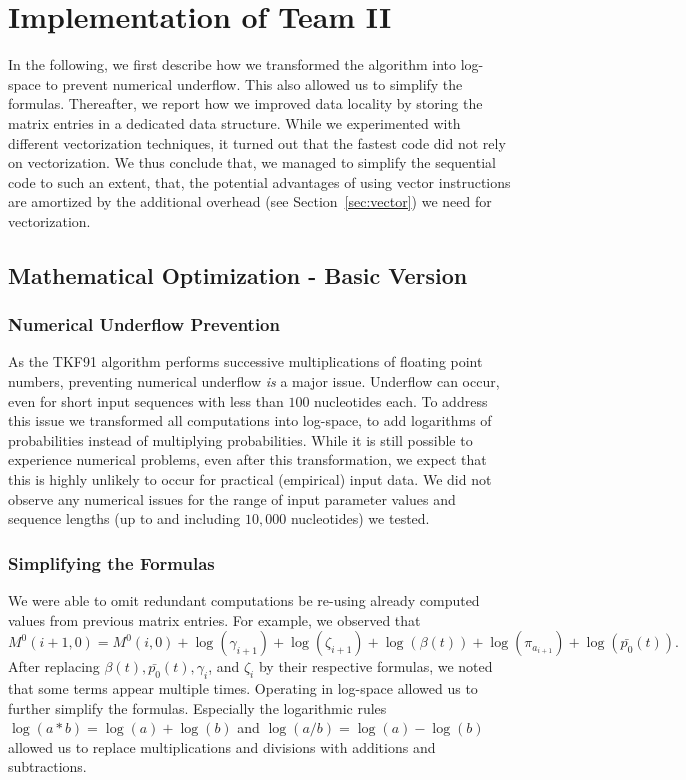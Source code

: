 \documentclass[runningheads,a4paper]{llncs}
\begin{document}
\section{Implementation of Team II}
\label{sec:implementation-2}

In the following, we first describe how we transformed the algorithm into log-space to prevent numerical underflow. 
This also allowed us to simplify the formulas. 
Thereafter, we report how we improved data locality by storing the matrix entries in a dedicated data structure. 
While we experimented with different vectorization techniques, it turned out that the fastest code did not rely on vectorization. 
We thus conclude that, we managed to simplify the sequential code to such an extent, that, the potential advantages of using vector instructions 
are amortized by the additional overhead (see Section~\ref{sec:vector}) we need for vectorization.

\subsection{Mathematical Optimization - Basic Version}

\subsubsection{Numerical Underflow Prevention}
\label{sec:log}

As the TKF91 algorithm performs successive multiplications of floating point numbers, preventing numerical underflow
{\em is} a major issue. Underflow can occur, even for short input sequences with less than $100$ nucleotides each.
To address this issue we transformed all computations into log-space, to add logarithms of probabilities instead of multiplying probabilities.
While it is still possible to experience numerical problems, even after this transformation, 
we expect that this is highly unlikely to occur for practical (empirical) input data.
We did not observe any numerical issues for the range of input parameter values and sequence lengths (up to and including $10,000$ nucleotides) 
we tested.

\subsubsection{Simplifying the Formulas}  
We were able to omit redundant computations be re-using already computed values from previous matrix entries.
For example, we observed that $$M^0(i+1,0) = M^0(i,0) + \log(\gamma_{i+1}) + \log(\zeta_{i+1}) + \log(\beta(t)) + \log(\pi_{a_{i+1}}) + \log(\bar{p_0}(t)).$$
After replacing $\beta(t), \bar{p_0}(t), \gamma_i$, and $\zeta_i$ by their respective formulas, we noted that some terms appear multiple times. 
Operating in log-space allowed us to further simplify the formulas. Especially the logarithmic rules $\log(a*b) = \log(a) + \log(b)$ and $\log(a/b) = \log(a) - \log(b)$ 
allowed us to replace multiplications and divisions with additions and subtractions.
\end{document}
